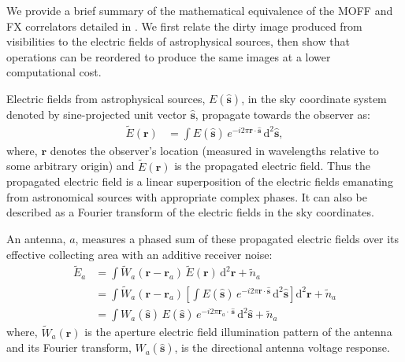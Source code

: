 \documentclass[a4paper,fleqn,usenatbib]{mnras}
\newcommand{\dif}{\mathrm{d}}
\begin{document}
We provide a brief summary of the mathematical equivalence of the MOFF and 
FX correlators detailed in \citet{mor11}. We first relate the dirty image produced 
from visibilities to the electric fields of astrophysical sources, then show that 
operations can be reordered to produce the same images at a lower 
computational cost.

Electric fields from astrophysical sources, $E(\hat{\mathbf{s}})$, in the sky
coordinate system denoted by sine-projected unit vector $\hat{\mathbf{s}}$, 
propagate towards the observer as:
\begin{align}
  \widetilde{E}(\mathbf{r}) &= \int E(\hat{\mathbf{s}})\,e^{-i2\pi\mathbf{r}\cdot\hat{\mathbf{s}}}\,\dif^2\hat{\mathbf{s}},
\end{align}
where, $\mathbf{r}$ denotes the observer's location (measured in wavelengths 
relative to some arbitrary origin) and $\widetilde{E}
(\mathbf{r})$ is the propagated electric field. Thus the propagated electric
field is a linear superposition of the electric fields emanating from
astronomical sources with appropriate complex phases. It can also be described
as a Fourier transform of the electric fields in the sky coordinates. 

An antenna, $a$, measures a phased sum of these propagated electric fields over
its effective collecting area with an additive receiver noise:
\begin{align}\label{eqn:measured-E-field}
  \widetilde{E}_a &= \int \widetilde{W}_a(\mathbf{r}-\mathbf{r}_a)\,\widetilde{E}(\mathbf{r})\,\dif^2\mathbf{r} + \widetilde{n}_a \\
                  &= \int \widetilde{W}_a(\mathbf{r}-\mathbf{r}_a) \left[ \int E(\hat{\mathbf{s}})\,e^{-i2\pi\mathbf{r}\cdot\hat{\mathbf{s}}}\,\dif^2\hat{\mathbf{s}} \right] \dif^2\mathbf{r} + \widetilde{n}_a \\
                  &= \int {W}_a(\hat{\mathbf{s}})\,E(\hat{\mathbf{s}})\,e^{-i2\pi\mathbf{r}_a\!\cdot\,\hat{\mathbf{s}}}\,\dif^2\hat{\mathbf{s}} + \widetilde{n}_a
\end{align}
where, $\widetilde{W}_a(\mathbf{r})$ is the aperture electric field illumination
pattern of the antenna and its Fourier transform, $W_a(\hat{\mathbf{s}})$, is the
directional antenna voltage response.
\end{document}
